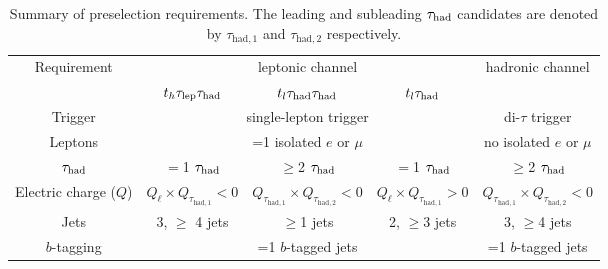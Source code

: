 \begin{table*}[t!]
\caption{\small{Summary of preselection requirements. 
The leading and subleading $\tau_{\mathrm{had}}$ candidates are denoted by $\tau_{\mathrm{had,1}}$ and $\tau_{\mathrm{had,2}}$ respectively.}}
\begin{center}
\begin{tabular}{c|ccc|c}
\toprule\toprule
\multirow{2}{*}{Requirement} &  \multicolumn{3}{c|}{leptonic channel}  & \multirow{2}{*}{hadronic channel} \\ 
& $t_h\tau_{\mathrm{lep}} \tau_{\mathrm{had}}$ & $t_l\tau_{\mathrm{had}} \tau_{\mathrm{had}}$ &  $t_l\tau_{\mathrm{had}}$ & $t_h\hadhad$\\
\midrule
Trigger & \multicolumn{3}{c|}{single-lepton trigger} & di-$\tau$ trigger  \\
Leptons  & \multicolumn{3}{c|}{=1 isolated $e$ or $\mu$}  & no isolated $e$ or $\mu$ \\
$\tau_{\mathrm{had}}$  & $=$1 $\tau_{\mathrm{had}}$ & $\geq$2 $\tau_{\mathrm{had}}$ & $=$1 $\tau_{\mathrm{had}}$ & $\geq$2 $\tau_{\mathrm{had}}$ \\
Electric charge ($Q$) & $Q_\ell \times Q_{\tau_{\mathrm{had,1}}} < 0$ & $Q_{\tau_{\mathrm{had,1}}} \times Q_{\tau_{\mathrm{had,2}}} < 0$ & $Q_\ell \times Q_{\tau_{\mathrm{had,1}}} > 0$ & $Q_{\tau_{\mathrm{had,1}}} \times Q_{\tau_{\mathrm{had,2}}} < 0$ \\
Jets  &  3, $\geq$ 4 jets & $\geq$1 jets & 2, $\geq$3 jets & 3, $\geq$4 jets \\
$b$-tagging & \multicolumn{3}{c|}{=1 $b$-tagged jets} & =1 $b$-tagged jets\\
\bottomrule\bottomrule
\end{tabular}
\label{tab:preselection}
\end{center}
\end{table*}
